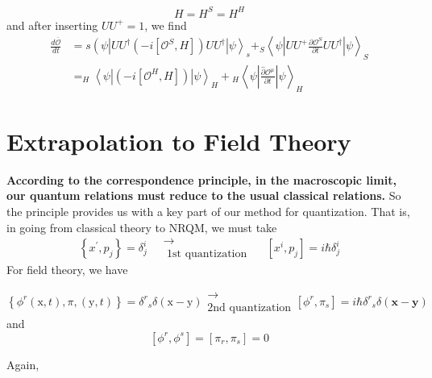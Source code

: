 \begin{equation}
    H=H^S=H^H
\end{equation}
and after inserting $UU^+=1$, we find
\begin{equation}
\begin{aligned}
\frac{d \overline{\mathcal{O}}}{d t} &=s\left(\psi\left|U U^{\dagger}\left(-i\left[\mathcal{O}^{S}, H\right]\right) U U^{\dagger}\right| \psi\right\rangle_{s}+_{S}\left\langle\psi\left|U U^{+} \frac{\partial \mathcal{O}^{S}}{\partial t} U U^{\dagger}\right| \psi\right\rangle_{S} \\
&=_{H}\left\langle\psi\left|\left(-i\left[\mathcal{O}^{H}, H\right]\right)\right| \psi\right\rangle_{H}+{}_{H}\left\langle\psi\left|\frac{\hat{\partial} \mathcal{O}^{\mu}}{\partial t}\right| \psi\right\rangle_{H}
\end{aligned}
\end{equation}
\section{Extrapolation to Field Theory}
\textbf{According to the correspondence principle, in the macroscopic limit, our quantum relations must reduce to the usual classical relations.} So the principle provides us with a key part of our method for quantization. That is, in going from classical theory to NRQM, we must take
$$\left\{x^{\prime}, p_{j}\right\}=\delta_{j}^{i} \quad \substack{\longrightarrow\\ \text { 1st quantization }} \quad\left[x^{i}, p_{j}\right]=i \hbar \delta_{j}^{i}$$
For field theory, we have
\begin{qt}
\begin{equation}
\left\{\phi^{r}(\mathrm{x}, t), \pi,(\mathrm{y}, t)\right\}=\delta^{r}{ }_s \delta(\mathrm{x}-\mathrm{y})\substack{\longrightarrow\\ \text{2nd quantization}}\left[\phi^{r}, \pi_{s}\right]=i \hbar \delta^{r}{ }_s \delta(\mathbf{x}-\mathbf{y}) 
\end{equation}
and
\begin{equation}
    \left[\phi^{r}, \phi^{s}\right]=\left[\pi_{r}, \pi_{s}\right]=0
\end{equation}
\end{qt}
Again, 

